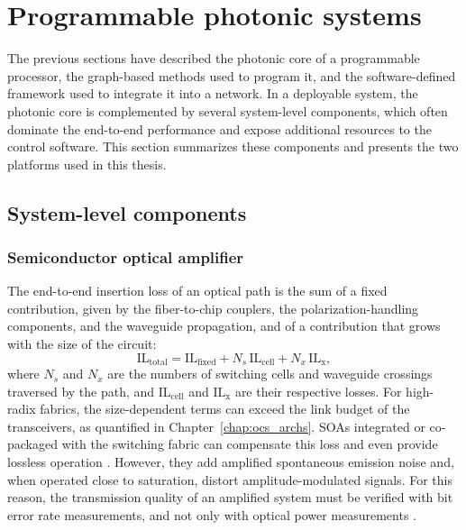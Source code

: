 \section{Programmable photonic systems}\label{sub:pip_systems}
The previous sections have described the photonic core of a programmable processor, the graph-based methods used to program it, and the software-defined framework used to integrate it into a network.
In a deployable system, the photonic core is complemented by several system-level components, which often dominate the end-to-end performance and expose additional resources to the control software.
This section summarizes these components and presents the two platforms used in this thesis.
\subsection{System-level components}\label{sub:system_component}
\subsubsection{Semiconductor optical amplifier}\label{sub:soa}
The end-to-end insertion loss of an optical path is the sum of a fixed contribution, given by the fiber-to-chip couplers, the polarization-handling components, and the waveguide propagation, and of a contribution that grows with the size of the circuit:
\begin{equation}
    \mathrm{IL}_{\text{total}} = \mathrm{IL}_{\text{fixed}} + N_s\,\mathrm{IL}_{\text{cell}} + N_x\,\mathrm{IL}_{\text{x}},
    \label{eq:ch2-loss-budget}
\end{equation}
where $N_s$ and $N_x$ are the numbers of switching cells and waveguide crossings traversed by the path, and $\mathrm{IL}_{\text{cell}}$ and $\mathrm{IL}_{\text{x}}$ are their respective losses.
For high-radix fabrics, the size-dependent terms can exceed the link budget of the transceivers, as quantified in Chapter~\ref{chap:ocs_archs}.
SOAs integrated or co-packaged with the switching fabric can compensate this loss and even provide lossless operation \cite{stabile2017towards, 7328999}.
However, they add amplified spontaneous emission noise and, when operated close to saturation, distort amplitude-modulated signals.
For this reason, the transmission quality of an amplified system must be verified with bit error rate measurements, and not only with optical power measurements \cite{baney2000theory, lippiatt2024analysis}.
